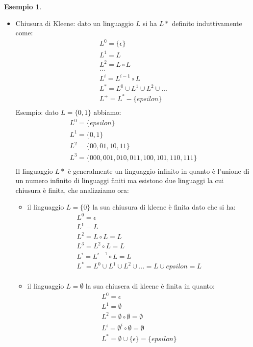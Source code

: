 \documentclass[a4paper]{book}
\theoremstyle{definition}%
\newtheorem*{esempio}{Esempio}
\begin{document}
\begin{esempio}
\begin{itemize}
  \item Chiusura di Kleene: dato un linguaggio $L$ si ha $L*$ definito induttivamente come:
    \begin{equation*}
    \begin{split}
      L^0 = \{\epsilon\} \\
      L^1 = L \\
      L^2 = L \circ L \\
      \dots \\
      L^i = L^{i-1} \circ L\\
      L^* = L^0 \cup L^1 \cup L^2 \cup \dots \\
      L^+ = L^* - \{epsilon\} \\
    \end{split}
    \end{equation*}
    Esempio: dato $L = \{0,1\}$ abbiamo:
    \[
    \begin{split}
      L^0 = \{epsilon\}\\
      L^1 = \{0, 1\}\\
      L^2 = \{00, 01, 10, 11\}\\
      L^3 = \{000, 001, 010, 011, 100, 101, 110, 111\} \\
    \end{split}
    \]
    Il linguaggio $L*$ è generalmente un linguaggio infinito in quanto è l'unione di un numero infinito di linguaggi finiti
    ma esistono due linguaggi la cui chiusura è finita, che analizziamo ora:
    \begin{itemize}
    \item il linguaggio $L = \{0\}$ la sua chiusura di kleene è finita dato che si ha:
      \[
      \begin{split}
        L^0 = \epsilon \\
        L^1 = L\\
        L^2 = L \circ L = L\\
        L^3 = L^2 \circ L = L\\
        L^i = L^{i-1} \circ L = L \\
        L^* = L^0 \cup L^1 \cup L^2 \cup \dots = L \cup {epsilon} = L\\
      \end{split}
      \]
      
    \item il linguaggio $L = \emptyset$ la sua chiusera di kleene è finita in quanto:
      \[
      \begin{split}
      L^0 = \epsilon \\
      L^1 = \emptyset \\
      L^2 = \emptyset \circ \emptyset = \emptyset \\
      L^i = \emptyset^i \circ \emptyset = \emptyset \\
      L^* = \emptyset \cup \{\epsilon\} = \{epsilon\} \\
      \end{split}
      \]
    \end{itemize}%
  \end{itemize}%


\end{esempio}
\end{document}
